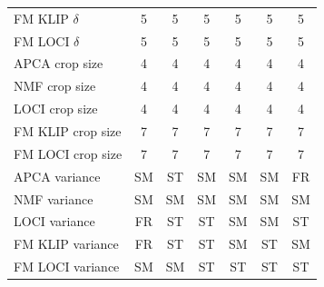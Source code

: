 \documentclass[11pt]{article}
\begin{document}
\begin{table}[htbp]
{\begin{tabular}{lcccccc}
FM KLIP $\delta$ & 5 & 5 & 5 & 5 & 5 & 5  \\

FM LOCI $\delta$ & 5 & 5 & 5 & 5 & 5 & 5  \\

APCA crop size & 4 & 4 & 4 & 4 & 4 & 4  \\

NMF crop size & 4 & 4 & 4 & 4 & 4 & 4  \\

LOCI crop size & 4 & 4 & 4 & 4 & 4 & 4  \\

FM KLIP crop size & 7 & 7 & 7 & 7 & 7 & 7  \\

FM LOCI crop size & 7 & 7 & 7 & 7 & 7 & 7  \\

APCA variance & SM & ST & SM & SM & SM & FR  \\

NMF variance & SM & SM & SM & SM & SM & SM  \\

LOCI variance & FR & ST & ST & SM & SM & ST  \\

FM KLIP variance & FR & ST & ST & SM & ST & SM  \\

FM LOCI variance & SM & SM & ST & ST & ST & ST  \\
\hline
\end{tabular}
}
\end{table}
\end{document}
